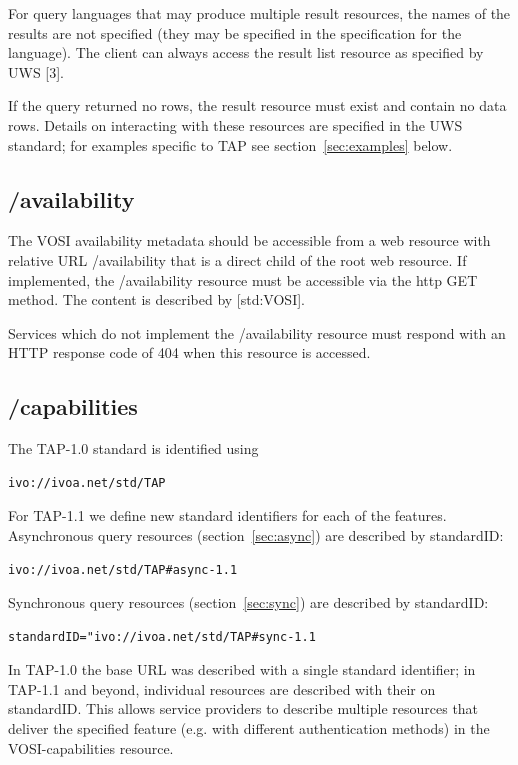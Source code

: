 \documentclass[11pt,letter]{ivoa}
\begin{document}
For query languages that may produce multiple result resources, the names of the 
results are not specified (they may be specified in the specification for the 
language). The client can always access the result list resource as specified by 
UWS [3].

If the query returned no rows, the result resource must exist and contain no 
data rows. Details on interacting with these resources are specified in the UWS 
standard; for examples specific to TAP see section~\ref{sec:examples} below.

\subsection{/availability}
\label{sec:vosi-availability}

The VOSI availability metadata should be accessible from a web resource with 
relative URL /availability that is a direct child of the root web resource. If 
implemented, the /availability resource must be accessible via the http GET 
method. The content is described by [std:VOSI].

Services which do not implement the /availability resource must respond with an 
HTTP response code of 404 when this resource is accessed.

\subsection{/capabilities}
\label{sec:vosi-capabilities}

The TAP-1.0 standard is identified using 
\begin{verbatim}
ivo://ivoa.net/std/TAP
\end{verbatim}

For TAP-1.1 we define new standard identifiers for each of the 
features. Asynchronous query resources (section~\ref{sec:async}) are described by standardID: 

\begin{verbatim}
ivo://ivoa.net/std/TAP#async-1.1 
\end{verbatim}

Synchronous query resources (section~\ref{sec:sync}) are described by standardID:

\begin{verbatim}
standardID="ivo://ivoa.net/std/TAP#sync-1.1 
\end{verbatim}

In TAP-1.0 the base URL was described with a single standard identifier; in 
TAP-1.1 and beyond, individual resources are described with their on 
standardID. This allows service providers to describe multiple resources that 
deliver the specified feature (e.g. with different authentication methods) in 
the VOSI-capabilities resource.
\end{document}
